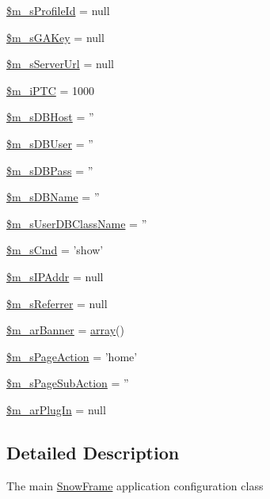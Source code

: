 \begin{DoxyCompactItemize}
\item 
\hyperlink{classSF__AppConfig_a935f137fe74f4707be2d81593c3a624d}{\$m\_\-sProfileId} = null
\item 
\hyperlink{classSF__AppConfig_a450e8067b60f9369bc4370c74ea0f862}{\$m\_\-sGAKey} = null
\item 
\hyperlink{classSF__AppConfig_af011645fea7e741d5cffcbe968799d90}{\$m\_\-sServerUrl} = null
\item 
\hyperlink{classSF__AppConfig_ab294fcb3988981bf2d504f3f3b07dd99}{\$m\_\-iPTC} = 1000
\item 
\hyperlink{classSF__AppConfig_a57f2837146ff87e7fbf582f9012f809c}{\$m\_\-sDBHost} = ''
\item 
\hyperlink{classSF__AppConfig_a8dcc4e27bd3f7632d3499f555f8d4b4d}{\$m\_\-sDBUser} = ''
\item 
\hyperlink{classSF__AppConfig_a69fda4b78906e9f8f515ff44e4beca5c}{\$m\_\-sDBPass} = ''
\item 
\hyperlink{classSF__AppConfig_a5989931373bd88e9cf65e47392df159f}{\$m\_\-sDBName} = ''
\item 
\hyperlink{classSF__AppConfig_a37cc028a41988ea3a5233fd132e189d9}{\$m\_\-sUserDBClassName} = ''
\item 
\hyperlink{classSF__AppConfig_a21ffd6ebc459ccba9514cbaee05b2ece}{\$m\_\-sCmd} = 'show'
\item 
\hyperlink{classSF__AppConfig_a2db945fecc9d0f95e19093d7829be78d}{\$m\_\-sIPAddr} = null
\item 
\hyperlink{classSF__AppConfig_a251ed856d45aa28d717a012291b71d26}{\$m\_\-sReferrer} = null
\item 
\hyperlink{classSF__AppConfig_a03606a66e78d358c6094f05f0857845d}{\$m\_\-arBanner} = \hyperlink{list_8php_aa3205d038c7f8feb5c9f01ac4dfadc88}{array}()
\item 
\hyperlink{classSF__AppConfig_a82cc1f3844569fa451cac5abc03b1a4d}{\$m\_\-sPageAction} = 'home'
\item 
\hyperlink{classSF__AppConfig_a980e6fd9e83172281b1e6dac50f16e9c}{\$m\_\-sPageSubAction} = ''
\item 
\hyperlink{classSF__AppConfig_a8913a39b1d58c42647d9d0b0f7ffe48c}{\$m\_\-arPlugIn} = null
\end{DoxyCompactItemize}


\subsection{Detailed Description}
The main \hyperlink{classSnowFrame}{SnowFrame} application configuration class 

